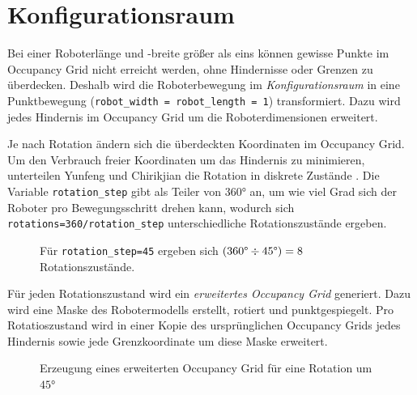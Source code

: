 \chapter{Konfigurationsraum} \label{ch:config-space}
Bei einer Roboterlänge und -breite größer als eins können gewisse Punkte im Occupancy Grid nicht erreicht werden, ohne Hindernisse oder Grenzen zu überdecken. 
Deshalb wird die Roboterbewegung im \textit{Konfigurationsraum} in eine Punktbewegung (\texttt{robot\_width = robot\_length = 1}) transformiert.
Dazu wird jedes Hindernis im Occupancy Grid um die Roboterdimensionen erweitert. \cite{roberts.1999}

Je nach Rotation ändern sich die überdeckten Koordinaten im Occupancy Grid.
Um den Verbrauch freier Koordinaten um das Hindernis zu minimieren, unterteilen Yunfeng und Chirikjian die Rotation in diskrete Zustände \cite{wang.2000}. Die Variable \texttt{rotation\_step} gibt als Teiler von $360$° an, um wie viel Grad sich der Roboter pro Bewegungsschritt drehen kann, wodurch sich \texttt{rotations=360/\texttt{rotation\_step}} unterschiedliche Rotationszustände ergeben.
\begin{figure}[H]
	\centering
	\footnotesize
	\centerline{\resizebox{0.6\linewidth}{!}{}}
	\caption{Für \texttt{rotation\_step=45} ergeben sich $(360 \text{\textdegree} \div 45 \text{\textdegree}) = 8$ Rotationszustände.}
\end{figure}

\vspace*{-0.2cm}
Für jeden Rotationszustand wird ein \textit{erweitertes Occupancy Grid} generiert. Dazu wird eine Maske des Robotermodells erstellt, rotiert und punktgespiegelt. Pro Rotatioszustand wird in einer Kopie des ursprünglichen Occupancy Grids jedes Hindernis sowie jede Grenzkoordinate um diese Maske erweitert.
\vspace*{0.025cm}
\begin{figure}[H]
	\centering
	\footnotesize
	\centerline{\resizebox{0.9\linewidth}{!}{}}
	\caption{Erzeugung eines erweiterten Occupancy Grid für eine Rotation um $45$°}
\end{figure}

